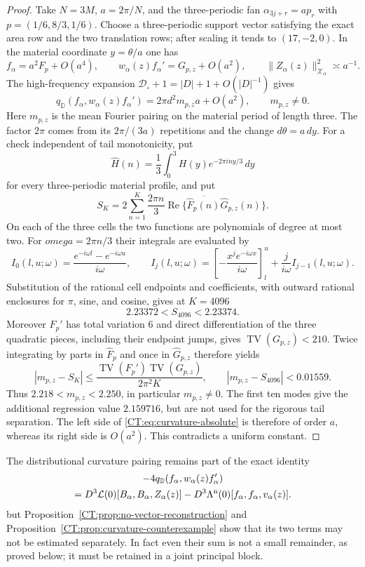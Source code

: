 \documentclass[11pt]{amsart}
\numberwithin{equation}{section}
\theoremstyle{definition}
\theoremstyle{remark}
\newcommand{\qD}{q_{\mathbb D}}
\newcommand{\X}{\mathcal X}
\begin{document}
\begin{proof}
Take $N=3M$, $a=2\pi/N$, and the three-periodic fan
$\alpha_{3j+r}=ap_r$ with $p=(1/6,8/3,1/6)$.  Choose a three-periodic
support vector satisfying the exact area row and the two translation rows;
after scaling it tends to $(17,-2,0)$.  In the material coordinate
$y=\theta/a$ one has
\[
 f_\alpha=a^2F_p+O(a^4),\qquad
 w_\alpha(z)f_\alpha'=G_{p,z}+O(a^2),\qquad
 \|Z_\alpha(z)\|_{\X_\alpha}^2\asymp a^{-1}.
\]
The high-frequency expansion
$\mathcal D_\circ+1=|D|+1+O(|D|^{-1})$ gives
\[
 \qD(f_\alpha,w_\alpha(z)f_\alpha')
 =2\pi d^2m_{p,z}a+O(a^2),
 \qquad m_{p,z}\ne0.
\]
Here $m_{p,z}$ is the mean Fourier pairing on the material period of length
three.  The factor $2\pi$ comes from its $2\pi/(3a)$ repetitions and the
change $d\theta=a\,dy$.  For a check independent of tail monotonicity, put
\[
 \widehat H(n)=\frac13\int_0^3H(y)e^{-2\pi iny/3}\,dy
\]
for every three-periodic material profile, and put
\[
 S_K=2\sum_{n=1}^K\frac{2\pi n}{3}
 \operatorname {Re}\{\overline{\widehat F_p(n)}
                         \widehat G_{p,z}(n)\}.
\]
On each of the three cells the two functions are polynomials of degree at
most two.  For $omega=2\pi n/3$ their integrals are evaluated by
\[
 I_0(l,u;\omega)=\frac{e^{-i\omega l}-e^{-i\omega u}}{i\omega},
 \qquad
 I_j(l,u;\omega)=
 \left[-\frac{x^je^{-i\omega x}}{i\omega}\right]_{l}^{u}
 +\frac{j}{i\omega}I_{j-1}(l,u;\omega).
\]
Substitution of the rational cell endpoints and coefficients, with
outward rational enclosures for $\pi$, sine, and cosine, gives at $K=4096$
\[
 2.23372<S_{4096}<2.23374.
\]
Moreover $F_p'$ has total variation $6$ and direct differentiation of the
three quadratic pieces, including their endpoint jumps, gives
$\operatorname {TV}(G_{p,z})<210$.  Twice integrating by parts in
$\widehat F_p$ and once in $\widehat G_{p,z}$ therefore yields
\[
 |m_{p,z}-S_K|
 \le\frac{\operatorname {TV}(F_p')\operatorname {TV}(G_{p,z})}
          {2\pi^2K},
 \qquad
 |m_{p,z}-S_{4096}|<0.01559.
\]
Thus $2.218<m_{p,z}<2.250$, in particular $m_{p,z}\ne0$.  The first ten
modes give the additional regression value $2.159716$, but are not used
for the rigorous tail separation.  The left side of
\eqref{CT:eq:curvature-absolute} is therefore of order $a$, whereas its right
side is $O(a^2)$.  This contradicts a uniform constant.
\end{proof}

The distributional curvature pairing remains part of the exact identity
\begin{multline}\label{CT:eq:curvature-as-difference}
 -4\qD(f_\alpha,w_\alpha(z)f_\alpha')\\
 =D^3\mathcal L(0)[B_\alpha,B_\alpha,Z_\alpha(z)]
  -D^3\Lambda^{\rm n}(0)
    [f_\alpha,f_\alpha,v_\alpha(z)].
\end{multline}
but Proposition~\ref{CT:prop:no-vector-reconstruction} and
Proposition~\ref{CT:prop:curvature-counterexample} show that its two terms may
not be estimated separately.  In fact even their sum is not a small
remainder, as proved below; it must be retained in a joint principal block.
\end{document}
